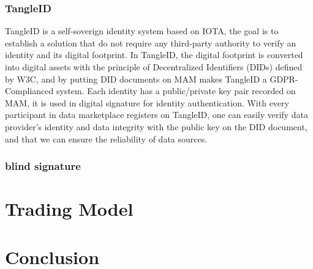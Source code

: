 \documentclass[journal,a4paper]{IEEEtran}
\begin{document}
\subsubsection{TangleID}
TangleID\cite{TangleID} is a self-soverign identity system based on IOTA, the goal is to establish a solution that do not require any third-party authority to verify an identity and its digital footprint. In TangleID, the digital footprint is converted into digital assets with the principle of Decentralized Identifiers (DIDs) defined by W3C, and by putting DID documents on MAM makes TangleID a GDPR-Complianced system. Each identity has a public/private key pair recorded on MAM, it is used in digital signature for identity authentication. With every participant in data marketplace registers on TangleID, one can easily verify data provider's identity and data integrity with the public key on the DID document, and that we can ensure the reliability of data sources.


\subsubsection{blind signature}


\section{Trading Model}

\section{Conclusion}



  







\end{document}
